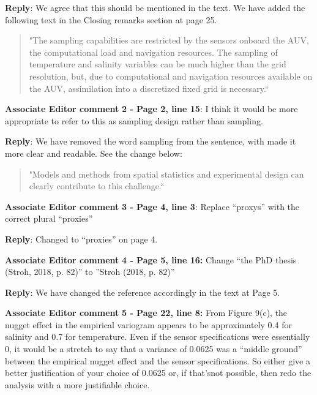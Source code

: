 \documentclass[a4paper]{article}
\def\aecom{\textbf{Associate Editor comment }}
\def\reply{\textbf{Reply}}
\begin{document}
\vspace{5mm}
\reply: We agree that this should be mentioned in the text. We have added the following text in the Closing remarks section at page 25.

\begin{quote}
    "The sampling capabilities are restricted by the sensors onboard the AUV, the computational load and navigation resources. The sampling of temperature and salinity variables can be much higher than the grid resolution, but, due to computational and navigation resources available on the AUV, assimilation into a discretized fixed grid is necessary.``
\end{quote}

\vspace{5mm}
\noindent \aecom \textbf{2 - Page 2, line 15}:  I think it would be more appropriate to refer to this as sampling design rather than sampling.

\vspace{5mm}
\reply: We have removed the word sampling from the sentence, with made it more clear and readable. See the change below:

\begin{quote}
    "Models and methods from spatial statistics and experimental design can clearly contribute to this challenge.``
\end{quote}

\vspace{5mm}
\noindent \aecom \textbf{3 - Page 4, line 3}:  Replace “proxys” with the correct plural “proxies”

\vspace{5mm}
\reply: Changed to “proxies” on page 4.

\vspace{5mm}
\noindent \aecom \textbf{4 - Page 5, line 16:}  Change  “the  PhD  thesis  (Stroh,  2018,  p.  82)”  to ”Stroh (2018, p. 82)”

\vspace{5mm}
\reply: We have changed the reference accordingly in the text at Page 5. 

\vspace{5mm}
\noindent \aecom \textbf{5 - Page 22, line 8:}  From Figure 9(c), the nugget effect in the empirical variogram appears to be approximately 0.4 for salinity and 0.7 for temperature.  Even if the sensor specifications were essentially 0, it would be a stretch to say that a variance of 0.0625 was a “middle ground” between the empirical nugget effect and the sensor specifications.  So either give a better justification of your choice of 0.0625 or, if that’snot possible, then redo the analysis with a more justifiable choice.
\end{document}
